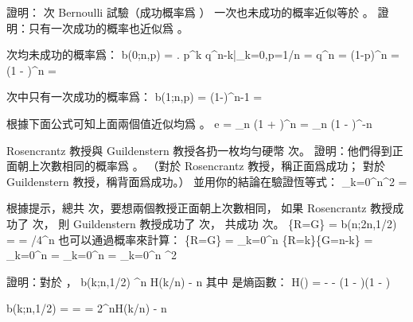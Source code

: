 \stopANSWER

\startEXERCISE\DIFFICULT
證明：  次 Bernoulli 試驗（成功概率爲 ）
一次也未成功的概率近似等於 。
證明：只有一次成功的概率也近似爲 。
\stopEXERCISE

\startANSWER
{} 次均未成功的概率爲：
\startformula
b(0;n,p)
  = \left. p^k q^{n-k}\right|_{k=0,p=1/n}
  =  q^n
  = (1-p)^n
  = \left(1 - \right)^n
  = 
\stopformula

 次中只有一次成功的概率爲：
\startformula
b(1;n,p)
  =   \left(1-\right)^{n-1}
  = 
\stopformula

根據下面公式可知上面兩個值近似均爲 。
\startformula
e = \lim_{n \to \infty}\left(1 + \right)^n
     = \lim_{n \to \infty}\left(1 - \right)^{-n}
\stopformula
\stopANSWER

\startEXERCISE\DIFFICULT
Rosencrantz 教授與 Guildenstern 教授各扔一枚均勻硬幣  次。
證明：他們得到正面朝上次數相同的概率爲 。
（\hint 對於 Rosencrantz 教授，稱正面爲成功；
對於 Guildenstern 教授，稱背面爲成功。）
並用你的結論在驗證恆等式：
\startformula
\sum_{k=0}^{n}^2 = 
\stopformula
\stopEXERCISE

\startANSWER
根據提示，總共  次，要想兩個教授正面朝上次數相同，
如果 Rosencrantz 教授成功了  次，
則 Guildenstern 教授成功了  次，
共成功  次。
\startformula
\Pr\{R=G\} = b(n;2n,1/2)
           = 
           = /4^n
\stopformula
也可以通過概率來計算：
\startformula\startmathalignment
\NC \Pr\{R=G\}
    \NC = \sum_{k=0}^n \Pr\{R=k\}\Pr\{G=n-k\} \NR
\NC \NC = \sum_{k=0}^n  \cdot {} \cdot
                                \cdot {} \NR
\NC \NC =  \sum_{k=0}^n   \NR
\NC \NC =  \sum_{k=0}^n ^2 \NR
\stopmathalignment\stopformula
\stopANSWER

\startEXERCISE\DIFFICULT
證明：對於 ，
\startformula
b(k;n,1/2) ^{n H(k/n) - n}
\stopformula
其中  是熵函數：
\startformula
H(\lambda) = -\lambda\lg{\lambda} - (1 - \lambda)\lg(1 - \lambda) 
\stopformula
\stopEXERCISE

\startANSWER
\startformula
b(k;n,1/2) = 
           = 
           \le {}
           = 2^{nH(k/n) - n}
\stopformula
\stopANSWER


